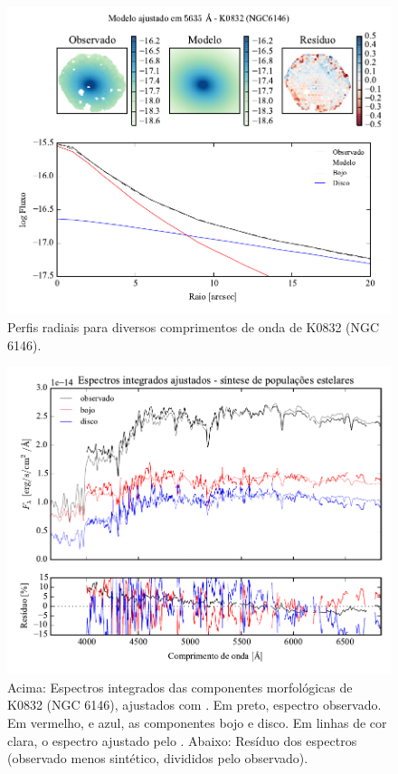 \begin{figure}
	\includegraphics[page=5]{figuras-decomp/K0832_sample006a}
	\caption[Perfis radiais para diversos comprimentos de onda de K0832 (NGC 6146)]
	{Perfis radiais para diversos comprimentos de onda de K0832 (NGC 6146).}
	\label{fig:decompRadprofSpec:K0832}
\end{figure}

\begin{figure}
	\includegraphics[page=9,width=\textwidth]{figuras/sample006a_synthesis}
	\caption[Espectros ajustados com \starlight das componentes morfológicas de
	K0832 (NGC 6146)]
	{Acima: Espectros integrados das componentes morfológicas de
	K0832 (NGC 6146), ajustados com \starlight. Em preto, espectro observado. Em
	vermelho, e azul, as componentes bojo e disco. Em linhas de cor clara, o
	espectro ajustado pelo \starlight. Abaixo: Resíduo dos espectros (observado
	menos sintético, divididos pelo observado).}
	\label{fig:decompSintese:K0832}
\end{figure}


